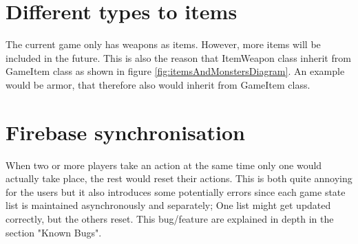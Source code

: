 \section{Different types to items}
The current game only has weapons as items. However, more items will be included in the future. This is also the reason that ItemWeapon class inherit from GameItem class as shown in figure \ref{fig:itemsAndMonstersDiagram}. An example would be armor, that therefore also would inherit from GameItem class.

\section{Firebase synchronisation}
When two or more players take an action at the same time only one would actually take place, the rest would reset their actions. This is both quite annoying for the users but it also introduces some potentially errors since each game state list is maintained asynchronously and separately; One list might get updated correctly, but the others reset. This bug/feature are explained in depth in the section "Known Bugs". 